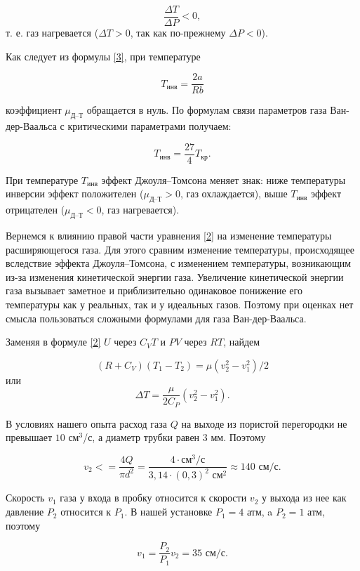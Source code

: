\documentclass[a4paper,12pt]{article}
\begin{document}
\[ \frac{\Delta T}{\Delta P} < 0, \]
т. е. газ нагревается ($ \Delta T > 0 $, так как по-прежнему $ \Delta P < 0 $).

Как следует из формулы \eqref{3}, при температуре 

\begin{equation}\label{inversion-T}
    T_{\text{инв}} = \frac{2a}{Rb} 
\end{equation}

коэффициент $ \mu_\text{Д--Т} $ обращается в нуль. По формулам связи параметров газа Ван-дер-Ваальса с критическими параметрами получаем: 

\begin{equation}\label{4}
    T_\text{инв} = \frac{27}{4} T_\text{кр}.
\end{equation}

При температуре $ T_\text{инв} $ эффект Джоуля–Томсона меняет знак: ниже температуры инверсии эффект положителен ($ \mu_\text{Д--Т} > 0 $, газ охлаждается), выше $ T_\text{инв} $ эффект отрицателен ($ \mu_\text{Д--Т} < 0 $, газ нагревается).

Вернемся к влиянию правой части уравнения \eqref{2} на изменение температуры расширяющегося газа. Для этого сравним изменение температуры, происходящее вследствие эффекта Джоуля–Томсона, с изменением температуры, возникающим из-за изменения кинетической энергии газа. Увеличение кинетической энергии газа вызывает заметное и приблизительно одинаковое понижение его температуры как у реальных, так и у идеальных газов. Поэтому при оценках нет смысла пользоваться сложными формулами для газа Ван-дер-Ваальса.

Заменяя в формуле \eqref{2} $ U $ через $ C_VT $ и $ PV $ через $ RT $, найдем

\[ \left(R+C_V\right)\left(T_1-T_2\right)=\mu\left(v_2^2-v_1^2\right)/2 \]
или
\[ \Delta T = \frac{\mu}{2C_P}\left(v_2^2-v_1^2\right). \]

В условиях нашего опыта расход газа $ Q  $ на выходе из пористой перегородки не превышает $ 10 $ см$ ^3 $/с, а диаметр трубки равен 3 мм. Поэтому

\[ v_2<=\frac{4Q}{\pi d^2} = \frac{4\cdot\text{см}^3/\text{с}}{3,14\cdot(0,3)^2\text{ см}^2} \approx 140 \text{ см}/\text{с}. \]

Скорость $ v_1 $ газа у входа в пробку относится к скорости $ v_2 $ у выхода из нее как давление $ P_2 $ относится к $ P_1 $. В нашей установке $ P_1 = 4 $ атм, a $ P_2 = 1 $ атм, поэтому

\[ v_1=\frac{P_2}{P_1}v_2 = 35 \text{ см}/\text{с}. \]
\end{document}

